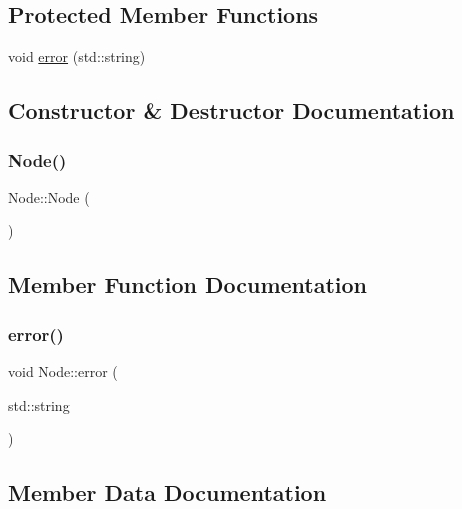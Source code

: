 \subsection*{Protected Member Functions}
\begin{DoxyCompactItemize}
\item 
void \hyperlink{class_node_aa1bb6c155277eb2c073a60c00674b8b6}{error} (std\+::string)
\end{DoxyCompactItemize}


\subsection{Constructor \& Destructor Documentation}
\mbox{\label{class_node_ad7a34779cad45d997bfd6d3d8043c75f}} 
\subsubsection{\texorpdfstring{Node()}{Node()}}
{\footnotesize\ttfamily Node\+::\+Node (\begin{DoxyParamCaption}{ }\end{DoxyParamCaption})}



\subsection{Member Function Documentation}
\mbox{\label{class_node_aa1bb6c155277eb2c073a60c00674b8b6}} 
\subsubsection{\texorpdfstring{error()}{error()}}
{\footnotesize\ttfamily void Node\+::error (\begin{DoxyParamCaption}\item[{std\+::string}]{ }\end{DoxyParamCaption})\hspace{0.3cm}{\ttfamily [protected]}}



\subsection{Member Data Documentation}
\mbox{\label{class_node_a8e50263ff9416be77e26edfbf6b926a1}} 
